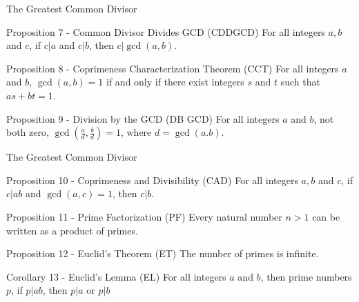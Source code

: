 \documentclass[11pt, aspectratio=169]{beamer}
\begin{document}
\begin{frame}{The Greatest Common Divisor}

\begin{block}{Proposition 7 - Common Divisor Divides GCD (CDDGCD)}
For all integers $a, b$ and $c$, if $c | a$ and $c | b$, then $c | \gcd(a,b)$.
\end{block}

\begin{block}{Proposition 8 - Coprimeness Characterization Theorem (CCT)}
For all integers $a$ and $b$, $\gcd(a,b) = 1$ if and only if there exist integers $s$ and $t$ such that $as + bt = 1$.
\end{block}

\begin{block}{Proposition 9 - Division by the GCD (DB GCD)}
For all integers $a$ and $b$, not both zero, $\gcd (\frac{a}{d}, \frac{b}{d}) = 1$, where $d = \gcd(a.b)$.
\end{block}

\end{frame}



\begin{frame}{The Greatest Common Divisor}

\begin{block}{Proposition 10 - Coprimeness and Divisibility (CAD)}
For all integers $a, b$ and $c$, if $c | ab$ and $\gcd(a,c) = 1$, then $c | b$.
\end{block}

\begin{block}{Proposition 11 - Prime Factorization (PF)}
Every natural number $n > 1$ can be written as a product of primes.
\end{block}

\begin{block}{Proposition 12 - Euclid’s Theorem (ET)}
The number of primes is infinite.
\end{block}

\begin{block}{Corollary 13 - Euclid’s Lemma (EL)}
For all integers $a$ and $b$, then prime numbers $p$, if $p | ab$, then $p | a$ or $p | b$
\end{block}
\end{frame}
\end{document}
